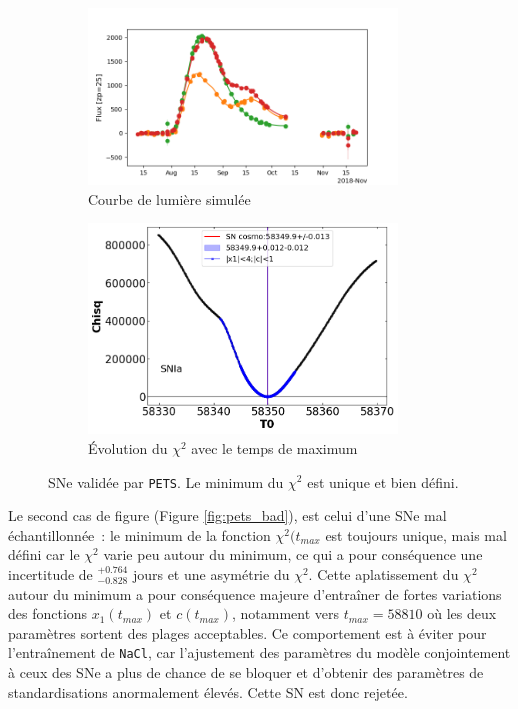 \documentclass{book}
\def\pets{\texttt{PETS}\xspace}
\def\nacl{\texttt{NaCl}\xspace}
\begin{document}
\begin{figure}
	\begin{subfigure}{0.45\textwidth}
		\centering
		\includegraphics[width=0.9\textwidth]{figures/276_lc_truth.png}
		\caption{Courbe de lumière simulée}
	\end{subfigure}
	\hfill
	\begin{subfigure}{0.45\textwidth}
		\centering
		\includegraphics[width=0.9\textwidth]{figures/276_Tmaxgrid.png}
		\caption{Évolution du $\chi^2$ avec le temps de maximum}
	\end{subfigure}
	\caption{SNe validée par \pets. Le minimum du $\chi^2$ est unique et bien défini.}
	\label{fig:pets_good}
\end{figure}
 
Le second cas de figure (Figure \ref{fig:pets_bad}), est celui d'une SNe mal échantillonnée~: le minimum de la fonction $\chi^2(t_{max}$ est toujours unique, mais mal défini car le $\chi^2$ varie peu autour du minimum, ce qui a pour conséquence une incertitude de $^{+0.764}_{-0.828}$ jours et une asymétrie du $\chi^2$. Cette aplatissement du $\chi^2$ autour du minimum a pour conséquence majeure d'entraîner de fortes variations des fonctions $x_1(t_{max})$ et $c(t_{max})$, notamment vers $t_{max}=58 810$ où les deux paramètres sortent des plages acceptables. Ce comportement est à éviter pour l'entraînement de \nacl, car l'ajustement des paramètres du modèle conjointement à ceux des SNe a plus de chance de se bloquer et d'obtenir des paramètres de standardisations anormalement élevés. Cette SN est donc rejetée.
\end{document}

